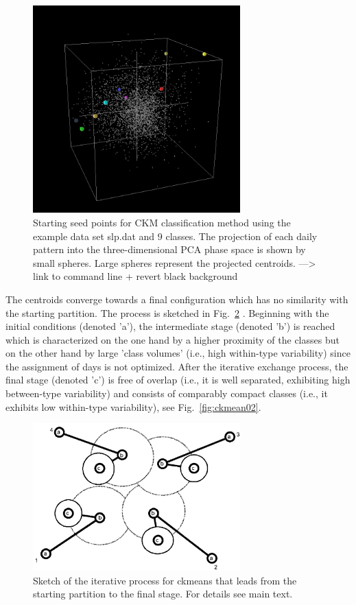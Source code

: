 \documentclass[12pt, oneside, a4paper, headsepline, plainheadsepline]{scrbook}
\begin{document}
%
\begin{figure}[h]
\centering
\includegraphics[width=8cm]{ckm01.png}
\caption{Starting seed points for CKM classification method using the example data set slp.dat and 9 classes.
The projection of each daily pattern into the three-dimensional PCA phase space is shown by small spheres. Large spheres represent the projected centroids. ---> link to command line + revert black background }
\label{fig:ckmean01}
\end{figure}
%
The centroids converge towards a final configuration which has no similarity with the starting partition. 
The process is sketched in Fig.~\ref{fig:ckmean} \citep[from][]{Enke1997}. Beginning with the initial conditions 
(denoted 'a'), the intermediate stage (denoted 'b') is reached which is characterized on the one hand by a 
higher proximity of the classes but on the other hand by large 'class volumes' (i.e., high within-type variability) 
since the assignment of days is not optimized. After the iterative exchange process, the final stage (denoted 'c') 
is free of overlap (i.e., it is well separated, exhibiting high between-type variability) and consists of comparably 
compact classes (i.e., it exhibits low within-type variability), see Fig.~\ref{fig:ckmean02}.\\
%
\begin{figure}[h]
\centering
\includegraphics[width=8cm]{ckmeans_diagram.png}
\caption{Sketch of the iterative process for ckmeans that leads from the starting partition to the final stage. For details see main text.}
\label{fig:ckmean}
\end{figure}
%
\end{document}
